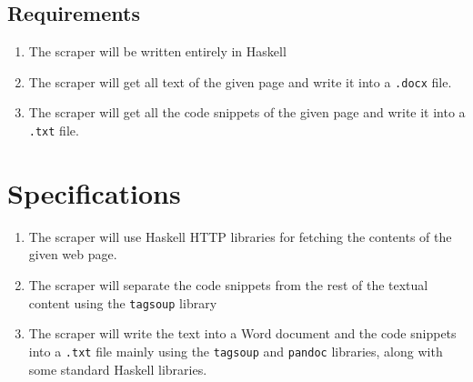 \documentclass{scrreprt}
\begin{document}
\section{Requirements}

\begin{enumerate}
    \item The scraper will be written entirely in Haskell
    \item The scraper will get all text of the given page and write it into a \texttt{.docx} file.
    \item The scraper will get all the code snippets of the given page and write it into a \texttt{.txt} file.
\end{enumerate}



    
        



\chapter{Specifications}


\begin{enumerate}
    \item The scraper will use Haskell HTTP libraries for fetching the contents of the given web page.
    \item The scraper will separate the code snippets from the rest of the textual content using the \texttt{tagsoup} library
    \item The scraper will write the text into a Word document and the code snippets into a \texttt{.txt} file mainly using the \texttt{tagsoup} and \texttt{pandoc} libraries, along with some standard Haskell libraries.
\end{enumerate}
\end{document}
